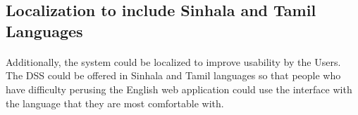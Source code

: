 \subsection{Localization to include Sinhala and Tamil Languages}

\paragraph{} Additionally, the system could be localized to improve usability by the Users. The DSS could be offered in Sinhala and Tamil languages so that people who have difficulty perusing the English web application could use the interface with the language that they are most comfortable with.